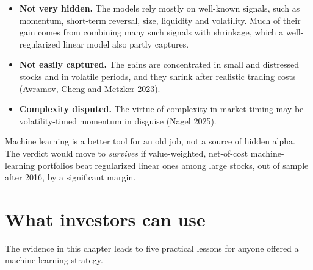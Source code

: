\begin{itemize}
  \item \textbf{Not very hidden.} The models rely mostly on well-known signals, such as momentum, short-term reversal, size, liquidity and volatility. Much of their gain comes from combining many such signals with shrinkage, which a well-regularized linear model also partly captures.
  \item \textbf{Not easily captured.} The gains are concentrated in small and distressed stocks and in volatile periods, and they shrink after realistic trading costs (Avramov, Cheng and Metzker 2023).
  \item \textbf{Complexity disputed.} The virtue of complexity in market timing may be volatility-timed momentum in disguise (Nagel 2025).
\end{itemize}

Machine learning is a better tool for an old job, not a source of hidden alpha. The verdict would move to \emph{survives} if value-weighted, net-of-cost machine-learning portfolios beat regularized linear ones among large stocks, out of sample after 2016, by a significant margin.


\section{What investors can use}
\label{sec:19-investors}

The evidence in this chapter leads to five practical lessons for anyone offered a machine-learning strategy.

